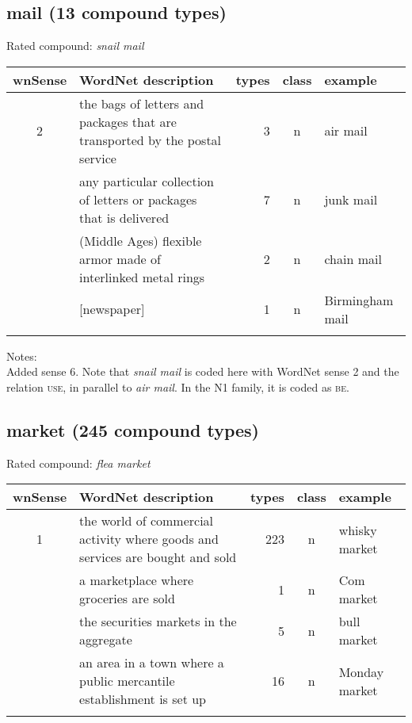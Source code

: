 \pagebreak[4]
\subsection{mail      (13 compound types)}
Rated compound: \emph{snail mail}

\vspace*{-.4cm}

\noindent
\begin{longtable}{c>{\raggedright\arraybackslash}p{5cm}rc>{\raggedright\arraybackslash}p{2cm}}\lsptoprule
{\small wnSense}&WordNet description&types&class&example\\\midrule
2&the bags of letters and packages that are transported by the postal service&3&n&air mail\\\tablevspace
4&any particular collection of letters or packages that is delivered&7&n&junk mail\\\tablevspace
5&(Middle Ages) flexible armor made of interlinked metal rings&2&n&chain mail\\\tablevspace
6&{}[newspaper]&1&n&Birmingham mail\\\lspbottomrule
\end{longtable}

\noindent
Notes:\\
Added sense 6. Note that \emph{snail mail} is coded here with WordNet sense 2 and the relation \textsc{use}, in parallel to \emph{air mail}. In the N1 family, it is coded as \textsc{be}.

\subsection{market    (245 compound types)}
Rated compound: \emph{flea market}

\vspace*{-.4cm}

\noindent
\begin{longtable}{c>{\raggedright\arraybackslash}p{5cm}rc>{\raggedright\arraybackslash}p{2cm}}\lsptoprule
{\small wnSense}&WordNet description&types&class&example\\\midrule
1&the world of commercial activity where goods and services are bought and sold&223&n&whisky market\\\tablevspace
3&a marketplace where groceries are sold&1&n&Com market\\\tablevspace
4&the securities markets in the aggregate&5&n&bull market\\\tablevspace
5&an area in a town where a public mercantile establishment is set up&16&n&Monday market\\\lspbottomrule
\end{longtable}

